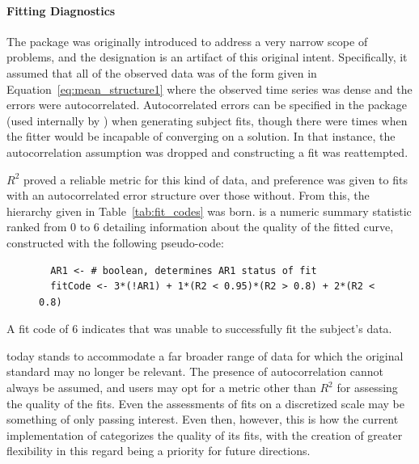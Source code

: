 \paragraph{Fitting Diagnostics}\label{sec:fitcode}

The  package was originally introduced to address a very narrow scope of problems, and the  designation is an artifact of this original intent. Specifically, it assumed that all of the observed data was of the form given in Equation~\ref{eq:mean_structure1} where the observed time series was dense and the errors were autocorrelated. Autocorrelated errors can be specified in the  package (used internally by ) when generating subject fits, though there were times when the fitter would be incapable of converging on a solution. In that instance, the autocorrelation assumption was dropped and constructing a fit was reattempted.

$R^2$ proved a reliable metric for this kind of data, and preference was given to fits with an autocorrelated error structure over those without. From this, the hierarchy given in Table~\ref{tab:fit_codes} was born.  is a numeric summary statistic ranked from 0 to 6 detailing information about the quality of the fitted curve, constructed with the following pseudo-code:

\begin{singlespace}
\begin{figure}[H]
\centering
\begin{BVerbatim}
  AR1 <- # boolean, determines AR1 status of fit
  fitCode <- 3*(!AR1) + 1*(R2 < 0.95)*(R2 > 0.8) + 2*(R2 < 0.8)
\end{BVerbatim}
\end{figure}
\end{singlespace}

A fit code of 6 indicates that  was unable to successfully fit the 
subject's data. 

 today stands to accommodate a far broader range of data for which the original  standard may no longer be relevant. The presence of autocorrelation cannot always be assumed, and users may opt for a metric other than $R^2$ for assessing the quality of the fits. Even the assessments of fits on a discretized scale may be something of only passing interest. Even then, however, this is how the current implementation of  categorizes the quality of its fits, with the creation of greater flexibility in this regard being a priority for future directions. 


